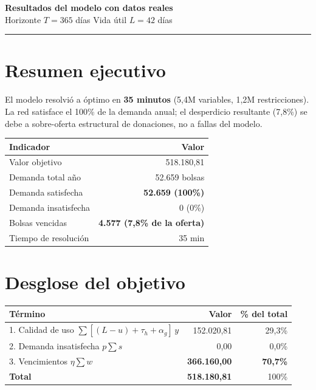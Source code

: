 \documentclass[11pt, a4paper]{article}
\begin{document}
\begin{center}
  {\LARGE\bfseries\color{ucblue} Resultados del modelo con datos reales}\\[3pt]
  {\normalsize Horizonte $T = 365$ días \quad Vida útil $L = 42$ días}
\end{center}
\vspace{-2pt}
{\color{ucblue}\rule{\linewidth}{1.5pt}}

\section{Resumen ejecutivo}

El modelo resolvió a óptimo en \textbf{35 minutos} (5{,}4M variables, 1{,}2M restricciones). La red satisface el 100\% de la demanda anual; el desperdicio resultante (7{,}8\%) se debe a sobre-oferta estructural de donaciones, no a fallas del modelo.

\begin{center}
\begin{tabular}{lr}
\toprule
\rowcolor{rowgray}\textbf{Indicador} & \textbf{Valor}\\
\midrule
Valor objetivo & 518.180,81 \\
Demanda total año & 52.659 bolsas \\
Demanda satisfecha & \textbf{\color{accentgreen} 52.659 (100\%)} \\
Demanda insatisfecha & 0 (0\%) \\
Bolsas vencidas & \textbf{\color{accentred} 4.577 (7,8\% de la oferta)} \\
Tiempo de resolución & 35 min \\
\bottomrule
\end{tabular}
\end{center}

\section{Desglose del objetivo}

\begin{center}
\begin{tabular}{lrr}
\toprule
\rowcolor{rowgray}\textbf{Término} & \textbf{Valor} & \textbf{\% del total}\\
\midrule
1. Calidad de uso $\sum[(L-u)+\tau_h+\alpha_g]\,y$ & 152.020,81 & 29,3\% \\
2. Demanda insatisfecha $p\sum s$ & 0,00 & 0,0\% \\
3. Vencimientos $\eta \sum w$ & \textbf{366.160,00} & \textbf{70,7\%} \\
\midrule
\textbf{Total} & \textbf{518.180,81} & 100\% \\
\bottomrule
\end{tabular}
\end{center}
\end{document}
